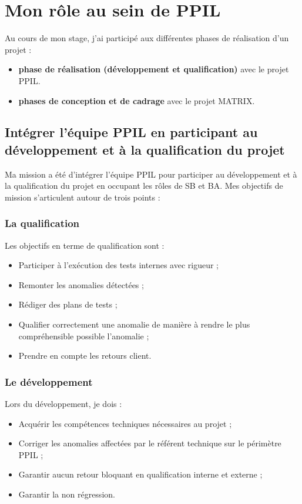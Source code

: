 \chapter{Mon rôle au sein de PPIL}
\label{sec:unchapitre}

Au cours de mon stage, j'ai participé aux différentes phases de réalisation d'un projet : 
\begin{itemize}
    \item \textbf{phase de réalisation (développement et qualification)} avec le projet PPIL.
    \item \textbf{phases de conception et de cadrage} avec le projet MATRIX.
\end{itemize}

\section{Intégrer l'équipe PPIL en participant au développement et à la qualification du projet}

Ma mission a été d'intégrer l'équipe PPIL pour participer au développement et à la qualification du projet en occupant les rôles de SB et BA. Mes objectifs de mission s'articulent autour de trois points :

\subsection{La qualification} 

Les objectifs en terme de qualification sont :
\begin{itemize}
    \item Participer à l'exécution des tests internes avec rigueur ;
    \item Remonter les anomalies détectées ;
    \item Rédiger des plans de tests ;
    \item Qualifier correctement une anomalie de manière à rendre le plus compréhensible possible l'anomalie ;
    \item Prendre en compte les retours client.
\end{itemize}

\subsection{Le développement} 

Lors du développement, je dois :

\begin{itemize}
    \item Acquérir les compétences techniques nécessaires au projet ; 
    \item Corriger les anomalies affectées par le référent technique sur le périmètre PPIL ;
    \item Garantir aucun retour bloquant en qualification interne et externe ;
    \item Garantir la non régression.
\end{itemize}

